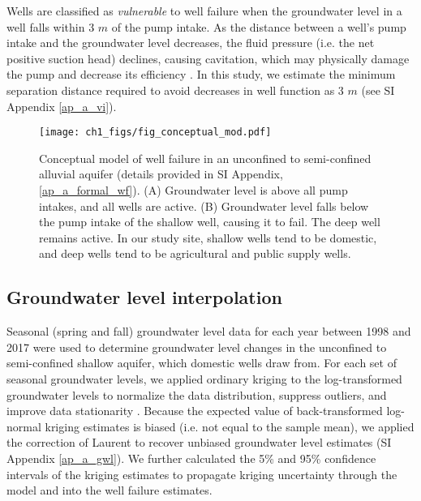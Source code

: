 Wells are classified as \textit{vulnerable} to well failure when the groundwater level in a well falls within 3 $m$ of the pump intake. As the distance between a well's pump intake and the groundwater level decreases, the fluid pressure (i.e. the net positive suction head) declines, causing cavitation, which may physically damage the pump and decrease its efficiency \citep{Tullis1989, Helweg1983}. In this study, we estimate the minimum separation distance required to avoid decreases in well function as 3 $m$ (see SI Appendix \ref{ap_a_vi}).

\begin{figure}%
	\centering
	\texttt{[image: ch1\_figs/fig\_conceptual\_mod.pdf]}
	\caption{Conceptual model of well failure in an unconfined to semi-confined alluvial aquifer (details provided in SI Appendix, \ref{ap_a_formal_wf}). (A) Groundwater level is above all pump intakes, and all wells are active. (B) Groundwater level falls below the pump intake of the shallow well, causing it to fail. The deep well remains active. In our study site, shallow wells tend to be domestic, and deep wells tend to be agricultural and public supply wells.}
	\label{fig:conceptual_model}
\end{figure}


\subsection{Groundwater level interpolation}

Seasonal (spring and fall) groundwater level data for each year between 1998 and 2017 \citep{gwl} were used to determine groundwater level changes in the unconfined to semi-confined shallow aquifer, which domestic wells draw from. For each set of seasonal groundwater levels, we applied ordinary kriging to the log-transformed groundwater levels to normalize the data distribution, suppress outliers, and improve data stationarity \citep{DeutschC.V.andJournel1992, Varouchakis2012}. Because the expected value of back-transformed log-normal kriging estimates is biased (i.e. not equal to the sample mean), we applied the correction of Laurent \citep{Laurent1963, JournelA.G.Huijbregts1978} to recover unbiased groundwater level estimates (SI Appendix \ref{ap_a_gwl}). We further calculated the 5\% and 95\% confidence intervals of the kriging estimates to propagate kriging uncertainty through the model and into the well failure estimates.   


